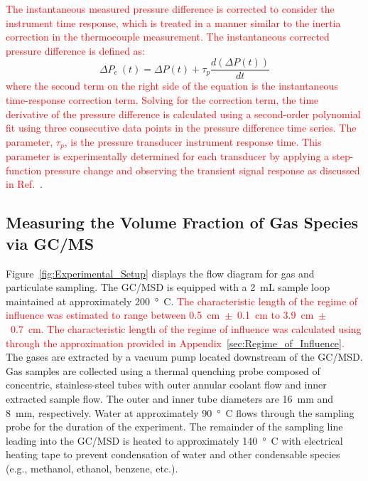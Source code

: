 \documentclass[12pt]{article}
\begin{document}
\textcolor{red}{The instantaneous measured pressure difference is corrected to consider the instrument time response, which is treated in a manner similar to the inertia correction in the thermocouple measurement. The instantaneous corrected pressure difference is defined as:}
\begin{equation}\label{eq:Delta_Pc}
\Delta P_c~(t) = \Delta P(t)+\tau_{p}\frac{d(\Delta P(t))}{dt}
\end{equation}
\textcolor{red}{where the second term on the right side of the equation is the instantaneous time-response correction term. Solving for the correction term, the time derivative of the pressure difference is calculated using a second-order polynomial fit using three consecutive data points in the pressure difference time series. The parameter, $\tau_p$, is the pressure transducer instrument response time. This parameter is experimentally determined for each transducer by applying a step-function pressure change and observing the transient signal response as discussed in Ref.~\cite{Sung2021}}.

\subsection{Measuring the Volume Fraction of Gas Species via GC/MS}
\label{ssec:Gas_Species_Setup}

Figure~\ref{fig:Experimental_Setup} displays the flow diagram for gas and particulate sampling. The GC/MSD is equipped with a 2~mL sample loop maintained at approximately \SI{200}{\degree C}. \textcolor{red}{The characteristic length of the regime of influence was estimated to range between 0.5~cm~$\pm$~0.1~cm to 3.9~cm~$\pm$~0.7~cm. The characteristic length of the regime of influence was calculated using through the approximation provided in Appendix~\ref{sec:Regime_of_Influence}.} The gases are extracted by a vacuum pump located downstream of the GC/MSD. Gas samples are collected using a thermal quenching probe composed of concentric, stainless-steel tubes with outer annular coolant flow and inner extracted sample flow. The outer and inner tube diameters are \SI{16}{mm} and \SI{8}{mm}, respectively. Water at approximately \SI{90}{\degree C} flows through the sampling probe for the duration of the experiment. The remainder of the sampling line leading into the GC/MSD is heated to approximately \SI{140}{\degree C} with electrical heating tape to prevent condensation of water and other condensable species (e.g., methanol, ethanol, benzene, etc.).
\end{document}
